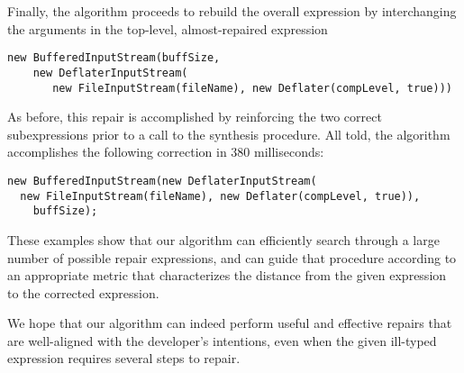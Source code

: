 Finally, the algorithm proceeds to rebuild the overall expression by interchanging the arguments in the top-level, almost-repaired expression
\begin{lstlisting}
new BufferedInputStream(buffSize,
    new DeflaterInputStream(
       new FileInputStream(fileName), new Deflater(compLevel, true)))
\end{lstlisting}
As before, this repair is accomplished by reinforcing the two correct subexpressions prior to a call to the synthesis procedure. All told, the algorithm accomplishes the following correction in 380 milliseconds:

\begin{lstlisting}   
new BufferedInputStream(new DeflaterInputStream(
  new FileInputStream(fileName), new Deflater(compLevel, true)),
    buffSize);
\end{lstlisting}

These examples show that our algorithm can efficiently search through a large number of possible repair expressions, and can guide that procedure according to an appropriate metric that characterizes the distance from the given expression to the corrected expression.

We hope that our algorithm can indeed perform useful and effective repairs that are well-aligned with the developer's intentions, even when the given ill-typed expression requires several steps to repair.
